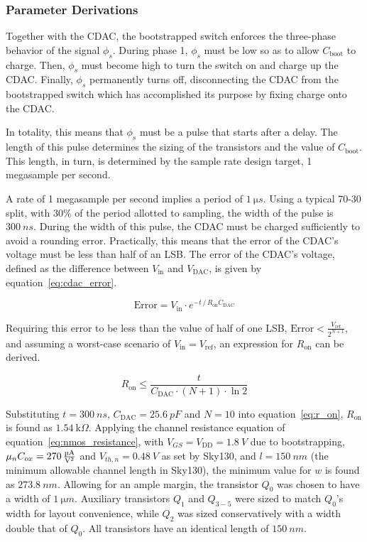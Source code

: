 \documentclass[12pt, a4paper]{article}
\begin{document}
\subsubsection{Parameter Derivations}
Together with the CDAC, the bootstrapped switch enforces the three-phase behavior of the signal $\phi_s$. 
During phase 1, $\phi_s$ must be low so as to allow $C_\mathrm{boot}$ to charge. Then, $\phi_s$ must become high to turn the switch on and charge up the CDAC.
Finally, $\phi_s$ permanently turns off, disconnecting the CDAC from the bootstrapped switch which has accomplished its purpose by fixing charge onto the CDAC.

In totality, this means that $\phi_s$ must be a pulse that starts after a delay. The length of this pulse determines the sizing of the transistors and the value
of $C_\mathrm{boot}$. This length, in turn, is determined by the sample rate design target, 1 megasample per second.

A rate of 1 megasample per second implies a period of $\qty{1}{\micro s}$. Using a typical 70-30 split, with 30\% of the period allotted to sampling, the width of the pulse
is $\qty{300}{ns}$. During the width of this pulse, the CDAC must be charged sufficiently to avoid a rounding error. Practically, this means that the error
of the CDAC's voltage must be less than half of an LSB. The error of the CDAC's voltage, defined as the difference between $V_\mathrm{in}$ and $V_\mathrm{DAC}$, is given by equation~\ref{eq:cdac_error}.

\begin{equation}
    \text{Error} = V_\mathrm{in} \cdot e^{-t \, /  \, R_\mathrm{on} C_\mathrm{DAC}} \label{eq:cdac_error}
\end{equation}

Requiring this error to be less than the value of half of one LSB, $\text{Error} < \frac{V_\mathrm{ref}}{2^{N+1}}$, and assuming a worst-case scenario of $V_\mathrm{in} = V_\mathrm{ref}$, an expression for $R_\mathrm{on}$ can be derived.

\begin{equation}
    R_\mathrm{on} \le \frac{t}{C_\mathrm{DAC} \cdot (N+1) \cdot \ln 2} \label{eq:r_on}
\end{equation}

Substituting $t = \qty{300}{ns}$, $C_\mathrm{DAC} = \qty{25.6}{pF}$ and $N = 10$ into equation~\ref{eq:r_on}, $R_\mathrm{on}$ is found as $\qty{1.54}{\kilo \Omega}$. Applying the channel resistance equation of equation~\ref{eq:nmos_resistance},
with $V_{GS} = V_\mathrm{DD} = \qty{1.8}{V}$ due to bootstrapping, $\mu_n C_{ox} = \qty{270}{\frac{\micro A}{V^2}}$ and $V_{th,n} = \qty{0.48}{V}$ as set by Sky130, and $l = \qty{150}{nm}$ (the minimum allowable channel length in Sky130), %
the minimum value for $w$ is found as $\qty{273.8}{nm}$. Allowing for an ample margin, the transistor $Q_0$ was chosen to have a width of $\qty{1}{\micro m}$. Auxiliary transistors $Q_1$ and $Q_{3-5}$ were sized to match $Q_0$'s width for layout convenience,
while $Q_2$ was sized conservatively with a width double that of $Q_0$. All transistors have an identical length of $\qty{150}{nm}$.
\end{document}
